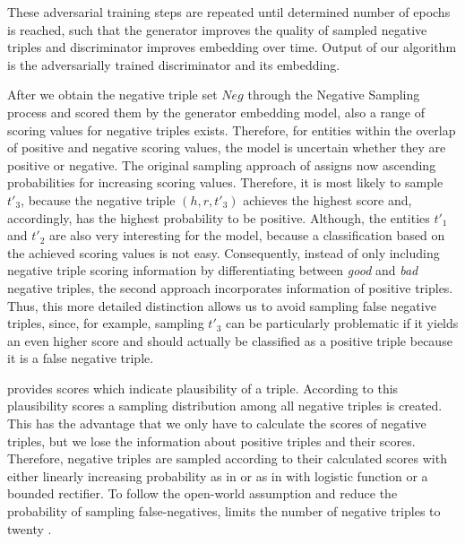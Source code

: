 

These adversarial training steps are repeated until determined number of epochs is reached, such that the generator improves the quality of sampled negative triples and discriminator improves embedding over time.
Output of our algorithm is the adversarially trained discriminator and its embedding.









After we obtain the negative triple set $Neg$ through the Negative Sampling process and scored them by the generator embedding model, also a range of scoring values for negative triples exists. 
Therefore, for entities within the overlap of positive and negative scoring values, the model is uncertain whether they are positive or negative.
The original sampling approach of \kbgan assigns now ascending probabilities for increasing scoring values.
Therefore, it is most likely to sample $t'_3$, because the negative triple $(h,r,t'_3)$ achieves the highest score and, accordingly, has the highest probability to be positive.
Although, the entities $t'_1$ and $t'_2$ are also very interesting for the model, because a classification based on the achieved scoring values is not easy.
Consequently, instead of only including negative triple scoring information by differentiating between \textit{good} and \textit{bad} negative triples, the second approach incorporates information of positive triples.
Thus, this more detailed distinction allows us to avoid sampling false negative triples, since, for example, sampling $t'_3$ can be particularly problematic if it yields an even higher score and should actually be classified as a positive triple because it is a false negative triple.




provides scores which indicate plausibility of a triple.
According to this plausibility scores a sampling distribution among all negative triples is created. 
This has the advantage that we only have to calculate the scores of negative triples, but we lose the information about positive triples and their scores.
Therefore, negative triples are sampled according to their calculated scores with either linearly increasing probability as in \cite{cai2017kbgan} or as in \cite{UKGE} with logistic function or a bounded rectifier.
To follow the open-world assumption and reduce the probability of sampling false-negatives,
\kbgan limits the number of negative triples to twenty \cite{cai2017kbgan}.



